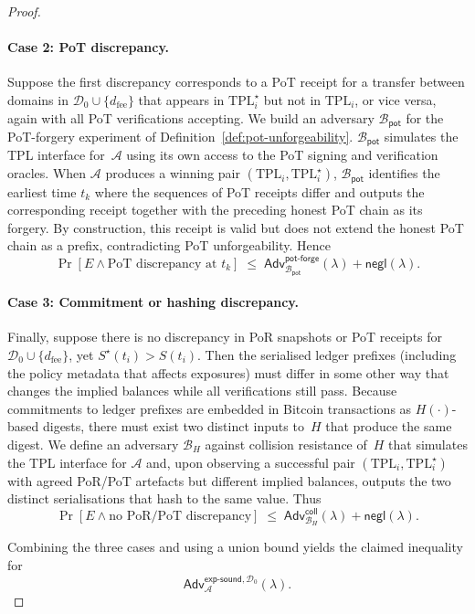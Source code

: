 \documentclass[11pt]{article}
\begin{document}
\begin{proof}
\paragraph{Case 2: PoT discrepancy.}
Suppose the first discrepancy corresponds to a PoT receipt for a transfer between
domains in $\mathcal{D}_0\cup\{d_{\mathrm{fee}}\}$ that appears in
$\mathrm{TPL}^\star_i$ but not in $\mathrm{TPL}_i$, or vice versa, again with all
PoT verifications accepting.
We build an adversary $\mathcal{B}_{\mathsf{pot}}$ for the PoT-forgery experiment
of Definition~\ref{def:pot-unforgeability}.
$\mathcal{B}_{\mathsf{pot}}$ simulates the TPL interface for~$\mathcal{A}$ using its
own access to the PoT signing and verification oracles.
When $\mathcal{A}$ produces a winning pair $(\mathrm{TPL}_i,\mathrm{TPL}^\star_i)$,
$\mathcal{B}_{\mathsf{pot}}$ identifies the earliest time $t_k$ where the sequences
of PoT receipts differ and outputs the corresponding receipt together with the
preceding honest PoT chain as its forgery.
By construction, this receipt is valid but does not extend the honest PoT chain as
a prefix, contradicting PoT unforgeability.
Hence
\[
  \Pr[E \wedge \text{PoT discrepancy at }t_k]
  \;\leq\;
  \mathsf{Adv}^{\mathsf{pot\mbox{-}forge}}_{\mathcal{B}_{\mathsf{pot}}}(\lambda)
  + \mathsf{negl}(\lambda).
\]

\paragraph{Case 3: Commitment or hashing discrepancy.}
Finally, suppose there is no discrepancy in PoR snapshots or PoT receipts for
$\mathcal{D}_0\cup\{d_{\mathrm{fee}}\}$, yet $S^\star(t_i) > S(t_i)$.
Then the serialised ledger prefixes (including the policy metadata that affects
exposures) must differ in some other way that changes the implied balances while
all verifications still pass.
Because commitments to ledger prefixes are embedded in Bitcoin transactions as
$H(\cdot)$-based digests, there must exist two distinct inputs to~$H$ that produce
the same digest.
We define an adversary $\mathcal{B}_H$ against collision resistance of~$H$ that
simulates the TPL interface for $\mathcal{A}$ and, upon observing a successful
pair $(\mathrm{TPL}_i,\mathrm{TPL}^\star_i)$ with agreed PoR/PoT artefacts but
different implied balances, outputs the two distinct serialisations that hash to
the same value.
Thus
\[
  \Pr[E \wedge \text{no PoR/PoT discrepancy}] \;\leq\;
  \mathsf{Adv}^{\mathsf{coll}}_{\mathcal{B}_H}(\lambda) + \mathsf{negl}(\lambda).
\]

Combining the three cases and using a union bound yields the claimed inequality for
\[
  \mathsf{Adv}^{\mathsf{exp\mbox{-}sound},\mathcal{D}_0}_{\mathcal{A}}(\lambda).
\]
\end{proof}
\end{document}
